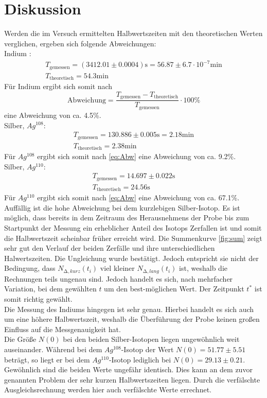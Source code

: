 \section{Diskussion}
Werden die im Versuch ermittelten Halbwertszeiten mit den theoretischen Werten verglichen, ergeben sich folgende Abweichungen: \\
Indium \cite{2}:
\begin{gather*}
	T_\text{gemessen} = (3412.01 \pm 0.0004) \text{s} = 56.87\pm6.7\cdot10^{-7} \text{min} \\
	T_\text{theoretisch} = 54.3 \text{min} 
\end{gather*}
Für Indium ergibt sich somit nach
\begin{equation}
	\text{Abweichung} = \frac{T_\text{gemessen} - T_\text{theoretisch}}{T_\text{gemessen}} \cdot 100\%
\end{equation}
eine Abweichung von ca. 4.5\%.
\\
Silber, $Ag^{108}$\cite{3}:
\begin{gather*}
\label{eq:Abw}
	T_\text{gemessen} = 130.886 \pm 0.005 \text{s} = 2.18 \text{min} \\
	T_\text{theoretisch} =  2.38 \text{min} 
\end{gather*}
Für $Ag^{108}$ ergibt sich somit nach \ref{eq:Abw} eine Abweichung von ca. 9.2\%.
\\
Silber, $Ag^{110}$\cite{3}:
\begin{gather*}
\label{eq:Abw}
	T_\text{gemessen} = 14.697 \pm 0.022 \text{s} \\
	T_\text{theoretisch} =  24.56 \text{s} 
\end{gather*}
Für $Ag^{110}$ ergibt sich somit nach \ref{eq:Abw} eine Abweichung von ca. 67.1\%.
\\
Auffällig ist die hohe Abweichung bei dem kurzlebigen Silber-Isotop. Es ist möglich, dass bereits in dem Zeitraum des Herausnehmens der Probe bis zum Startpunkt der Messung ein erheblicher Anteil des Isotops Zerfallen ist und somit die Halbwertszeit scheinbar früher erreicht wird. Die Summenkurve \ref{fig:sum} zeigt sehr gut den Verlauf der beiden Zerfälle und ihre unterschiedlichen Halwertszeiten. Die Ungleichung wurde bestätigt. Jedoch entspricht sie nicht der Bedingung, dass $N_{\increment, kurz}(t_i)$ viel kleiner $N_{\increment, lang}(t_i)$ ist, weshalb die Rechnungen teils ungenau sind. Jedoch handelt es sich, nach mehrfacher Variation, bei dem gewählten $t$ um den best-möglichen Wert. Der Zeitpunkt $t^*$ ist somit richtig gewählt.
\\
Die Messung des Indiums hingegen ist sehr genau. Hierbei handelt es sich auch um eine höhere Halbwertszeit, weshalb die Überführung der Probe keinen großen Einfluss auf die Messgenauigkeit hat. 
\\
Die Größe $N(0)$ bei den beiden Silber-Isotopen liegen ungewöhnlich weit auseinander. 
Während bei dem $Ag^{108}$-Isotop der Wert $N(0) = 51.77 \pm 5.51$ beträgt, so liegt er bei dem $Ag^{110}$-Isotop lediglich bei $N(0) = 29.13 \pm 0.21$. Gewöhnlich sind die beiden Werte ungefähr identisch. Dies kann an dem zuvor genannten Problem der sehr kurzen Halbwertszeiten liegen. Durch die verfälschte Ausgleichsrechnung werden hier auch verfälschte Werte errechnet. 